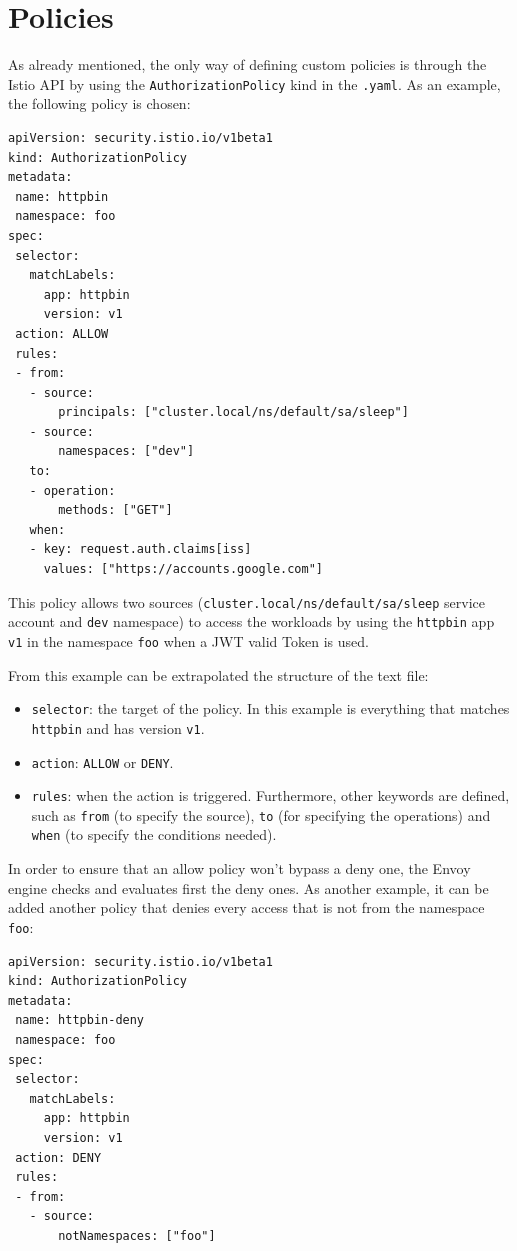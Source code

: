 \section{Policies}
As already mentioned, the only way of defining custom policies is through the Istio API by using the \texttt{AuthorizationPolicy} kind in the \texttt{.yaml}. As an example, the following policy is chosen:

\begin{lstlisting}
apiVersion: security.istio.io/v1beta1
kind: AuthorizationPolicy
metadata:
 name: httpbin
 namespace: foo
spec:
 selector:
   matchLabels:
     app: httpbin
     version: v1
 action: ALLOW
 rules:
 - from:
   - source:
       principals: ["cluster.local/ns/default/sa/sleep"]
   - source:
       namespaces: ["dev"]
   to:
   - operation:
       methods: ["GET"]
   when:
   - key: request.auth.claims[iss]
     values: ["https://accounts.google.com"]
\end{lstlisting}

\noindent This policy allows two sources (\texttt{cluster.local/ns/default/sa/sleep} service account and \texttt{dev} namespace) to access the workloads by using the \texttt{httpbin} app \texttt{v1} in the namespace \texttt{foo} when a JWT valid Token is used.

\noindent From this example can be extrapolated the structure of the text file:

\begin{itemize}
 \item \texttt{selector}: the target of the policy. In this example is everything that matches \texttt{httpbin} and has version \texttt{v1}.
 \item \texttt{action}: \texttt{ALLOW} or \texttt{DENY}.
 \item \texttt{rules}: when the action is triggered. Furthermore, other keywords are defined, such as \texttt{from} (to specify the source), \texttt{to} (for specifying the operations) and \texttt{when} (to specify the conditions needed).
\end{itemize}

In order to ensure that an allow policy won't bypass a deny one, the Envoy engine checks and evaluates first the deny ones. As another example, it can be added another policy that denies every access that is not from the namespace \texttt{foo}:

\begin{lstlisting}
apiVersion: security.istio.io/v1beta1
kind: AuthorizationPolicy
metadata:
 name: httpbin-deny
 namespace: foo
spec:
 selector:
   matchLabels:
     app: httpbin
     version: v1
 action: DENY
 rules:
 - from:
   - source:
       notNamespaces: ["foo"]
\end{lstlisting}

